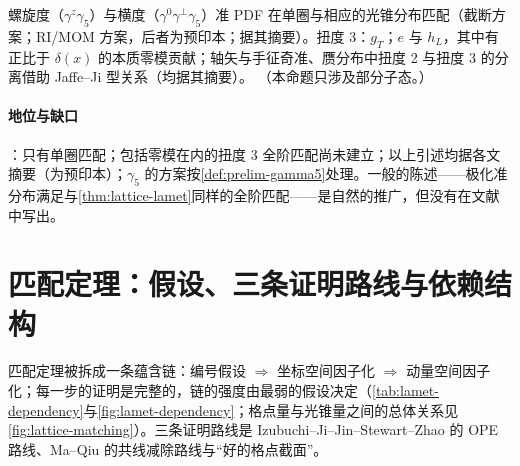 \begin{proposition}\label{prop:lamet-polarized}
螺旋度（$\gamma^z\gamma_5$）与横度（$\gamma^0\gamma^\perp\gamma_5$）准 PDF 在单圈与相应的光锥分布匹配（截断方案\cite{XiongEtAl2014}；RI/MOM 方案\cite{Lin:2018pvv,Liu:2018hxv}，后者为预印本；据其摘要）。扭度 3：$g_T$\cite{Bhattacharya:2020xlt}；$e$ 与 $h_L$，其中有正比于 $\delta(x)$ 的本质零模贡献\cite{Bhattacharya:2020jfj}；轴矢\cite{Braun:2021aon}与手征奇\cite{Braun:2021gvv}准、赝分布中扭度 2 与扭度 3 的分离借助 Jaffe--Ji 型关系（均据其摘要）。
（本命题只涉及部分子态。）
\end{proposition}

\paragraph{地位与缺口}
\tagP：只有单圈匹配；包括零模在内的扭度 3 全阶匹配尚未建立；以上引述均据各文摘要（\cite{Liu:2018hxv}为预印本）；$\gamma_5$ 的方案按\cref{def:prelim-gamma5}处理。一般的陈述——极化准分布满足与\cref{thm:lattice-lamet}同样的全阶匹配——是自然的推广，但没有在文献中写出。

\section{匹配定理：假设、三条证明路线与依赖结构}\label{sec:lattice-matching}

匹配定理被拆成一条蕴含链：编号假设 $\Rightarrow$ 坐标空间因子化 $\Rightarrow$ 动量空间因子化；每一步的证明是完整的，链的强度由最弱的假设决定（\cref{tab:lamet-dependency}与\cref{fig:lamet-dependency}；格点量与光锥量之间的总体关系见\cref{fig:lattice-matching}）。三条证明路线是 Izubuchi--Ji--Jin--Stewart--Zhao 的 OPE 路线\cite{IzubuchiEtAl2018}、Ma--Qiu 的共线减除路线\cite{Ma:2014jla}与“好的格点截面”\cite{MaQiu2018}。

